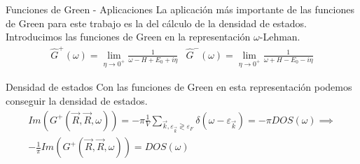 \documentclass{beamer}
\begin{document}
\begin{frame}{Funciones de Green - Aplicaciones \cite{fetter1971quantum}}
    La aplicación más importante de las funciones de Green para este trabajo es la del cálculo de la densidad de estados. Introducimos las funciones de Green en la representación $\omega$-Lehman.
    \begin{equation}
        \begin{array}{cc}
            \hat{G}^+(\omega) = \lim_{\eta\to 0^+}\frac{1}{\omega - H + E_0 + i\eta} & \hat{G}^-(\omega) = \lim_{\eta\to 0^+}\frac{1}{\omega + H - E_0 - i\eta}
        \end{array}
    \end{equation}
    \begin{block}{Densidad de estados}
        Con las funciones de Green en esta representación podemos conseguir la densidad de estados.
        \begin{equation}
            \begin{split}
                Im(G^+(\vec{R}, \vec{R}, \omega)) = -\pi\frac{1}{V}\sum_{\vec{k}, \varepsilon_{\vec{k}}\gtrless\varepsilon_F}\delta(\omega - \varepsilon_{\vec{k}}) = -\pi DOS(\omega) \implies \\ -\frac{1}{\pi}Im\left(G^+\left(\vec{R}, \vec{R}, \omega\right)\right) = DOS\left(\omega\right)
            \end{split}
        \end{equation}
    \end{block}
\end{frame}
\end{document}
